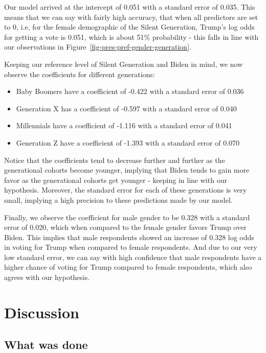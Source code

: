 \documentclass[
  letterpaper,
  DIV=11,
  numbers=noendperiod]{scrartcl}
\begin{document}
Our model arrived at the intercept of 0.051 with a standard error of
0.035. This means that we can say with fairly high accuracy, that when
all predictors are set to 0, i.e, for the female demographic of the
Silent Generation, Trump's log odds for getting a vote is 0.051, which
is about 51\% probability - this falls in line with our observations in
Figure~\ref{fig-pres-pref-gender-generation}.

Keeping our reference level of Silent Generation and Biden in mind, we
now observe the coefficients for different generations:

\begin{itemize}
\item
  Baby Boomers have a coefficient of -0.422 with a standard error of
  0.036
\item
  Generation X has a coefficient of -0.597 with a standard error of
  0.040
\item
  Millennials have a coefficient of -1.116 with a standard error of
  0.041
\item
  Generation Z have a coefficient of -1.393 with a standard error of
  0.070
\end{itemize}

Notice that the coefficients tend to decrease further and further as the
generational cohorts become younger, implying that Biden tends to gain
more favor as the generational cohorts get younger - keeping in line
with our hypothesis. Moreover, the standard error for each of these
generations is very small, implying a high precision to these
predictions made by our model.

Finally, we observe the coefficient for male gender to be 0.328 with a
standard error of 0.020, which when compared to the female gender favors
Trump over Biden. This implies that male respondents showed an increase
of 0.328 log odds in voting for Trump when compared to female
respondents. And due to our very low standard error, we can say with
high confidence that male respondents have a higher chance of voting for
Trump compared to female respondents, which also agrees with our
hypothesis.

\hypertarget{sec-discussion}{%
\section{Discussion}\label{sec-discussion}}

\hypertarget{sec-first-point}{%
\subsection{What was done}\label{sec-first-point}}
\end{document}
